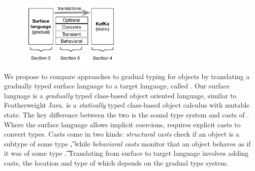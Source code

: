 \documentclass[USenglish]{tex/lipics-v2016}f
\begin{document}
\begin{figure}
\vspace{-6mm}
\includegraphics[width=5cm]{fig1}
\vspace{-7mm}\end{figure}

We propose to compare approaches to gradual typing for objects by translating
a gradually typed surface language to a target language, called \kafka. Our
surface language is a \emph{gradually} typed class-based object oriented
language, similar to Featherweight Java. \kafka is a \emph{statically} typed
class-based object calculus with mutable state. The key difference
between the two is the sound type system and casts of \kafka.
Where the surface language allows implicit coercions, \kafka requires
explicit casts to convert types. Casts come in two kinds:
\emph{structural casts} check if an object is a subtype of some type
\t, while \emph{behavioral casts} monitor that an object
behaves as if it was of some type \t. Translating from surface to target language
involves adding casts, the location and type of which depends on the gradual type system.
\end{document}
